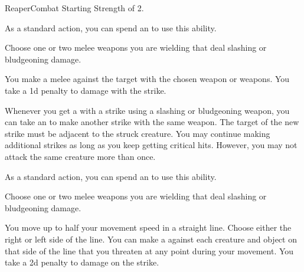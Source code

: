     \begin{feat}{Reaper}{Combat}
        \featpre Starting Strength of 2.

         As a standard action, you can spend an  to use this ability.
        \begin{ability}
            \begin{spelltargetinginfo}
                \spellspecial Choose one or two melee weapons you are wielding that deal slashing or bludgeoning damage.
            \end{spelltargetinginfo}
            \begin{spelleffects}
                \spelleffect You make a melee  against the target with the chosen weapon or weapons.
                You take a \minus1d penalty to damage with the strike.
            \end{spelleffects}
        \end{ability}

         Whenever you get a  with a strike using a slashing or bludgeoning weapon, you can take an  to make another strike with the same weapon.
        The target of the new strike must be adjacent to the struck creature.
        You may continue making additional strikes as long as you keep getting critical hits.
        However, you may not attack the same creature more than once.

         As a standard action, you can spend an  to use this ability.
        \begin{ability}
            \begin{spelltargetinginfo}
                \spellspecial Choose one or two melee weapons you are wielding that deal slashing or bludgeoning damage.
            \end{spelltargetinginfo}
            \begin{spelleffects}
                \spelleffect You move up to half your movement speed in a straight line.
                Choose either the right or left side of the line.
                You can make a  against each creature and object on that side of the line that you threaten at any point during your movement.
                You take a \minus2d penalty to damage on the strike.
            \end{spelleffects}
        \end{ability}


\end{feat}
